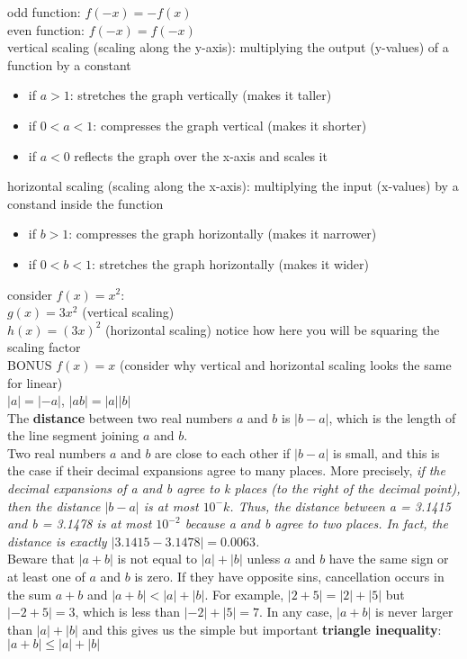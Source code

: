 \documentclass{article}
\begin{document}
odd function: $f(-x) = -f(x)$\\
even function: $f(-x) = f(-x)$\\

vertical scaling (scaling along the y-axis): multiplying the output (y-values) of a function by a constant
	\begin{itemize}
		\item if $a > 1$: stretches the graph vertically (makes it taller)
		\item if $0 < a < 1$: compresses the graph vertical (makes it shorter)
		\item if $a < 0$ reflects the graph over the x-axis and scales it
	\end{itemize}

horizontal scaling (scaling along the x-axis): multiplying the input (x-values) by a constand inside the function
	\begin{itemize}
		\item if $b > 1$: compresses the graph horizontally (makes it narrower)
		\item if $0 < b < 1$: stretches the graph horizontally (makes it wider)
	\end{itemize}

consider $f(x) = x^2$:\\
$g(x) = 3x^2$ (vertical scaling)\\
$h(x) = (3x)^2$ (horizontal scaling) notice how here you will be squaring the scaling factor\\

BONUS $f(x) = x$ (consider why vertical and horizontal scaling looks the same for linear)\\

$\lvert a\rvert = \lvert -a\rvert$, $\lvert ab\rvert = \lvert a\rvert\lvert b\rvert$\\
The \textbf{distance} between two real numbers $a$ and $b$ is $\lvert b - a \rvert$, which is the length of the line segment joining $a$ and $b$.\\
Two real numbers $a$ and $b$ are close to each other if $\lvert b - a\rvert$ is small, and this is the case if their decimal expansions agree to many places. More precisely, \textit{if the decimal expansions of a and b agree to k places (to the right of the decimal point), then the distance $\lvert b - a\rvert$ is at most $10^-k$. Thus, the distance between a = 3.1415 and b = 3.1478 is at most $10^{-2}$ because a and b agree to two places. In fact, the distance is exactly $\lvert3.1415 - 3.1478\rvert = 0.0063$.}\\
Beware that $\lvert a + b\rvert$ is not equal to $\lvert a\rvert + \lvert b\rvert$ unless $a$ and $b$ have the same sign or at least one of $a$ and $b$ is zero. If they have opposite sins, cancellation occurs in the sum $a + b$ and $\lvert a+b\rvert < \lvert a\rvert + \lvert b\rvert$. For example, $\lvert 2 + 5\rvert = \lvert2\rvert + \lvert5\rvert$ but $\lvert-2 + 5\rvert = 3$, which is less than $\lvert-2\rvert + \lvert5\rvert = 7$. In any case, $\lvert a + b\rvert$ is never larger than $\lvert a\rvert + \lvert b\rvert$ and this gives us the simple but important \textbf{triangle inequality}: $\lvert a + b\rvert \leq \lvert a\rvert + \lvert b\rvert$\\
\end{document}
